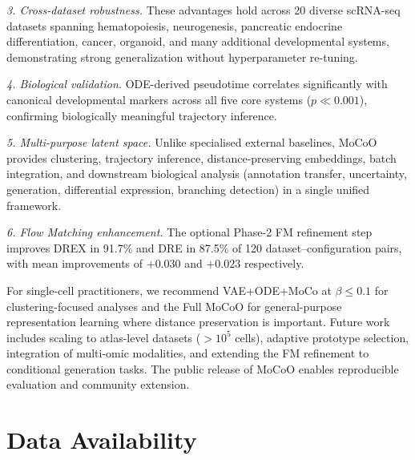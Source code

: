 \documentclass[biology,article,submit,pdftex]{Definitions/mdpi}
\begin{document}
\textit{3. Cross-dataset robustness.} These advantages hold across 20 diverse scRNA-seq datasets spanning hematopoiesis, neurogenesis, pancreatic endocrine differentiation, cancer, organoid, and many additional developmental systems, demonstrating strong generalization without hyperparameter re-tuning.

\textit{4. Biological validation.} ODE-derived pseudotime correlates significantly with canonical developmental markers across all five core systems ($p \ll 0.001$), confirming biologically meaningful trajectory inference.

\textit{5. Multi-purpose latent space.} Unlike specialised external baselines, MoCoO provides clustering, trajectory inference, distance-preserving embeddings, batch integration, and downstream biological analysis (annotation transfer, uncertainty, generation, differential expression, branching detection) in a single unified framework.

\textit{6. Flow Matching enhancement.} The optional Phase-2 FM refinement step improves DREX in 91.7\% and DRE in 87.5\% of 120 dataset--configuration pairs, with mean improvements of $+0.030$ and $+0.023$ respectively.

For single-cell practitioners, we recommend VAE+ODE+MoCo at $\beta{\leq}0.1$ for clustering-focused analyses and the Full MoCoO for general-purpose representation learning where distance preservation is important. Future work includes scaling to atlas-level datasets ($>10^5$ cells), adaptive prototype selection, integration of multi-omic modalities, and extending the FM refinement to conditional generation tasks. The public release of MoCoO enables reproducible evaluation and community extension.

\section*{Data Availability}



\end{document}
